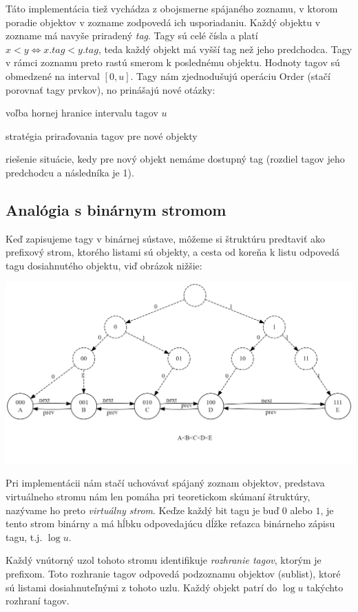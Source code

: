 \documentclass[
  digital,     %
  oneside,     %
  nosansbold,  %
  nocolorbold, %
  lof,         %
  lot,         %
]{fithesis4}
\begin{document}
Táto implementácia tiež vychádza z obojsmerne spájaného zoznamu, v ktorom poradie objektov v zozname zodpovedá ich usporiadaniu. Každý objektu v zozname má navyše priradený \textit{tag}. Tagy sú celé čísla a platí $x < y \iff x.tag < y.tag$, teda každý objekt má vyšší tag než jeho predchodca. Tagy v rámci zoznamu preto rastú smerom k poslednému objektu. Hodnoty tagov sú obmedzené na interval $[0, u]$. Tagy nám zjednodušujú operáciu Order (stačí porovnať tagy prvkov), no prinášajú nové otázky:
\begin{compactenum}
  \item voľba hornej hranice intervalu tagov $u$
  \item stratégia priraďovania tagov pre nové objekty
  \item riešenie situácie, kedy pre nový objekt nemáme dostupný tag (rozdiel tagov jeho predchodcu a následníka je 1).
\end{compactenum}

\subsection{Analógia s binárnym stromom}
Keď zapisujeme tagy v binárnej sústave, môžeme si štruktúru predtaviť ako prefixový strom, ktorého listami sú objekty, a cesta od koreňa k listu odpovedá tagu dosiahnutého objektu, viď obrázok nižšie:

\includegraphics[width=\textwidth]{graphics/graphviz.png}

Pri implementácii nám stačí uchovávať spájaný zoznam objektov, predstava virtuálneho stromu nám len pomáha pri teoretickom skúmaní štruktúry, nazývame ho preto \textit{virtuálny strom}. Keďze každý bit tagu je buď $0$ alebo $1$, je tento strom binárny a má hĺbku odpovedajúcu dĺžke reťazca binárneho zápisu tagu, t.j. $\log{u}$.

Každý vnútorný uzol tohoto stromu identifikuje \textit{rozhranie tagov}, ktorým je prefixom. Toto rozhranie tagov odpovedá podzoznamu objektov (sublist), ktoré sú listami dosiahnuteľnými z tohoto uzlu. Každý objekt patrí do $\log{u}$ takýchto rozhraní tagov.
\end{document}
